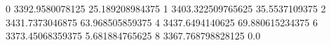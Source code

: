 0 3392.9580078125 25.189208984375
1 3403.322509765625 35.5537109375
2 3431.7373046875 63.968505859375
4 3437.6494140625 69.880615234375
6 3373.45068359375 5.681884765625
8 3367.768798828125 0.0
